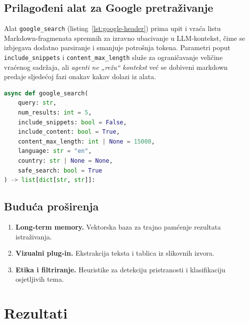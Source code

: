 \documentclass[zavrsnirad]{fer}
\begin{document}
\section{Prilagođeni alat za Google pretraživanje}
\label{sec:google-tool}

Alat \texttt{google\_search} (listing~\ref{lst:google-header}) prima
upit i vraća listu Markdown-fragmenata spremnih za izravno 
ubacivanje u LLM-kontekst, čime se izbjegava
dodatno parsiranje i smanjuje potrošnja tokena. Parametri poput
\texttt{include\_snippets} i \texttt{content\_max\_length} služe za
ograničavanje veličine vraćenog sadržaja, ali
\emph{agenti ne „režu“ kontekst} već se dobiveni markdown predaje
sljedećoj fazi onakav kakav dolazi iz alata.

\begin{lstlisting}[language=Python, caption={Potpis funkcije google\_search}, label={lst:google-header}]
async def google_search(
    query: str,
    num_results: int = 5,
    include_snippets: bool = False,
    include_content: bool = True,
    content_max_length: int | None = 15000,
    language: str = "en",
    country: str | None = None,
    safe_search: bool = True
) -> list[dict[str, str]]:
\end{lstlisting}

\section{Buduća proširenja}
\label{sec:future-work}

\begin{enumerate}[label=\arabic*., leftmargin=1.5em]
  \item \textbf{Long-term memory.}  Vektorska baza za trajno pamćenje
        rezultata istraživanja.
  \item \textbf{Vizualni plug-in.}  Ekstrakcija teksta i tablica iz
        slikovnih izvora.
  \item \textbf{Etika i filtriranje.}  Heuristike za detekciju
        pristranosti i klasifikaciju osjetljivih tema.
\end{enumerate}




\chapter{Rezultati}
\end{document}
